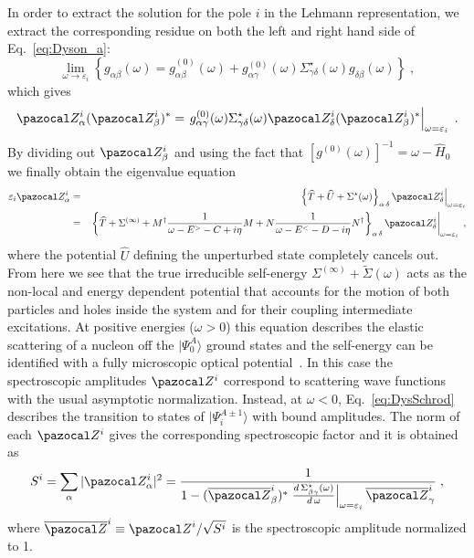In order to extract the solution for the pole $i$ in the Lehmann representation, we extract the corresponding residue on both the left and right hand side of Eq.~\eqref{eq:Dyson_a}:
 \begin{equation}
   \lim _{\omega \rightarrow \varepsilon_i}
   \left\{
     g_{\alpha\beta}(\omega) = g^{(0)}_{\alpha\beta}(\omega) + g^{(0)}_{\alpha\gamma}(\omega)  \Sigma^\star_{\gamma\delta}(\omega) g_{\delta\beta}(\omega)
   \right\} \; ,
 \end{equation}
which gives
 \begin{equation}
    \pazocal Z^i_\alpha (\pazocal Z^i_\beta)^*  =  \left. g^{(0)}_{\alpha\gamma}(\omega)  \Sigma^\star_{\gamma\delta}(\omega) \pazocal Z^i_\delta (\pazocal Z^i_\beta)^*
    \right|_{\omega = \varepsilon_i}
 \; .
 \end{equation}
By dividing out $\pazocal Z^i_\beta$ and using the fact that $[g^{(0)}(\omega)]^{-1} = \omega - \widehat{H}_0$ %
we finally obtain the  eigenvalue equation
 \begin{eqnarray}
   \varepsilon_i   \pazocal Z^i_\alpha &=&   \left. \left\{ \widehat{T} + \widehat{U} +   \Sigma^\star(\omega)   \right\}_{\alpha \, \delta}
  \pazocal Z^i_\delta  \right|_{\omega = \varepsilon_i}
  \nonumber \\
  &=&  \left. \left\{  \widehat{T}  +  \Sigma^{(\infty)} +M^\dagger\frac1{\omega - E^> -C + i \eta}M +N\frac1{\omega - E^< -D - i \eta}N^\dagger     \right\}_{\alpha \, \delta}
  \pazocal Z^i_\delta  \right|_{\omega = \varepsilon_i}  \; ,
\label{eq:DysSchrod}
 \end{eqnarray}
where the potential $\widehat{U}$ defining the unperturbed state completely cancels out. From here we see that the true irreducible self-energy $\Sigma^{(\infty)}+\widetilde\Sigma(\omega)$
acts as the non-local and energy dependent potential that accounts for the motion of both particles and holes inside the system and for their
coupling intermediate excitations.
At positive energies ($\omega > 0$) this equation describes the elastic scattering of a nucleon off the $|\Psi^A_0\rangle$ ground
states and the self-energy can be identified with a fully microscopic optical potential~\cite{ch11_Capuzzi1996,ch11_Cederbaum2001,ch11_Barbieri2005}.
In this case the spectroscopic amplitudes $\pazocal Z^i$ correspond to scattering wave functions with the usual asymptotic
normalization.
Instead, at $\omega < 0$, Eq.~\eqref{eq:DysSchrod}  describes the transition to states of $|\Psi^{A\pm1}_i\rangle$ with bound amplitudes.
The norm of each $\pazocal Z^i$ gives the corresponding spectroscopic factor and it is obtained as
\begin{equation}
 S^i = \sum_\alpha |\pazocal Z^i_\alpha|^2 =  \frac 1 {1 - (\overline{\pazocal Z}^i_\beta)^*
   \left. \frac{d \, \Sigma^\star_{\beta \gamma}(\omega)}{d \, \omega} \right|_{\omega = \varepsilon_i}
    \overline{\pazocal Z}^i_\gamma}   \; ,
\label{eq:SFnorm1}
\end{equation}
where $\overline{\pazocal Z}^i \equiv {\pazocal Z}^i / \sqrt{S^i}$ is the spectroscopic amplitude normalized to 1.

